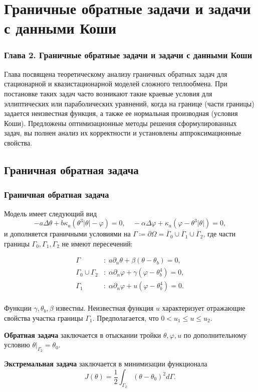 \section{Граничные обратные задачи и задачи с данными Коши}\label{sec:rev}
\begin{frame}
    \frametitle{Глава 2. Граничные обратные задачи и задачи с данными Коши}
    Глава посвящена теоретическому анализу граничных обратных задач для
    стационарной и квазистационарной моделей сложного теплообмена.
    При постановке таких задач часто возникают такие краевые условия для эллиптических
    или параболических уравнений, когда на границе (части границы) задается
    неизвестная функция, а также ее нормальная производная (условия Коши).
    Предложены оптимизационные методы решения сформулированных задач, вы
    полнен анализ их корректности и установлены аппроксимационные свойства.
\end{frame}

\subsection{Граничная обратная задача}\label{subsec:rev}

\begin{frame}
    \frametitle{Граничная обратная задача}
    Модель имеет следующий вид
    \begin{equation}
        \label{eq:2_1:initial}
        - a \Delta \theta + b \kappa_a(\theta ^ 3 | \theta | - \varphi) = 0,  \quad
        - \alpha \Delta \varphi + \kappa_a (\varphi - \theta ^3 | \theta |) = 0,
    \end{equation}
    и дополняется граничными условиями на
    $\Gamma \coloneqq \partial \Omega =\overline{\Gamma}_0 \cup \overline{\Gamma}_1 \cup \overline{\Gamma}_2$,
    где части границы $\Gamma_0, \Gamma_1, \Gamma_2$ не имеют пересечений:

    \begin{equation}
        \label{eq:2_1:initial-boundary}
        \begin{aligned}
            \Gamma &: \; a \partial_n \theta + \beta (\theta - \theta _b) = 0, \\
            \Gamma_0 \cup \Gamma_2 &: \; \alpha \partial_n \varphi
            + \gamma(\varphi - \theta_b ^4 ) = 0, \\
            \Gamma_1 &: \; \alpha \partial_n \varphi + u(\varphi - \theta_b ^4 ) = 0. \\
        \end{aligned}
    \end{equation}

    Функции $\gamma, \theta_b, \beta$ известны.
    Неизвестная функция $u$ характеризует отражающие свойства участка границы $\Gamma_1$.
    Предполагается, что $0 < u_1 \leq u \leq u_2$.

    \textbf{Обратная задача} заключается в отыскании тройки $\theta, \varphi, u$
    по дополнительному условию $\theta|_{\Gamma_2} = \theta_0$.

    \textbf{Экстремальная задача} заключается в минимизации функционала
    \[ J(\theta) = \frac{1}{2} \int_{\Gamma_2} (\theta - \theta_0)^2 d\Gamma. \]
\end{frame}


